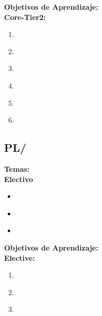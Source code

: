 \noindent \textbf{Objetivos de Aprendizaje:}\\
\noindent \textbf{Core-Tier2:}
\begin{enumerate}
	\setcounter{enumi}{0}
	\item \PLLanguageTranslationandExecutionLODistinguishA\xspace[\PLLanguageTranslationandExecutionLODistinguishALevel]\label{sec:BOK:PLLanguageTranslationandExecutionLODistinguishA}
	\item \PLLanguageTranslationandExecutionLODistinguishSyntax\xspace[\PLLanguageTranslationandExecutionLODistinguishSyntaxLevel]\label{sec:BOK:PLLanguageTranslationandExecutionLODistinguishSyntax}
	\item \PLLanguageTranslationandExecutionLOSketch\xspace[\PLLanguageTranslationandExecutionLOSketchLevel]\label{sec:BOK:PLLanguageTranslationandExecutionLOSketch}
	\item \PLLanguageTranslationandExecutionLOExplainHowImplementations\xspace[\PLLanguageTranslationandExecutionLOExplainHowImplementationsLevel]\label{sec:BOK:PLLanguageTranslationandExecutionLOExplainHowImplementations}
	\item \PLLanguageTranslationandExecutionLOIdentifyAndLeaks\xspace[\PLLanguageTranslationandExecutionLOIdentifyAndLeaksLevel]\label{sec:BOK:PLLanguageTranslationandExecutionLOIdentifyAndLeaks}
	\item \PLLanguageTranslationandExecutionLODiscussTheLimitations\xspace[\PLLanguageTranslationandExecutionLODiscussTheLimitationsLevel]\label{sec:BOK:PLLanguageTranslationandExecutionLODiscussTheLimitations}
\end{enumerate}


\subsection{PL/\PLSyntaxAnalysis}\label{sec:BOK:PLSyntaxAnalysis}
\noindent \textbf{Temas:}\\
\noindent \textbf{Electivo}
\begin{itemize}
	\item \PLSyntaxAnalysisTopicScanning\label{sec:BOK:PLSyntaxAnalysisTopicScanning}
	\item \PLSyntaxAnalysisTopicParsing\label{sec:BOK:PLSyntaxAnalysisTopicParsing}
	\item \PLSyntaxAnalysisTopicGenerating\label{sec:BOK:PLSyntaxAnalysisTopicGenerating}
\end{itemize}


\noindent \textbf{Objetivos de Aprendizaje:}\\
\noindent \textbf{Elective:}
\begin{enumerate}
	\setcounter{enumi}{0}
	\item \PLSyntaxAnalysisLOUseFormalSpecify\xspace[\PLSyntaxAnalysisLOUseFormalSpecifyLevel]\label{sec:BOK:PLSyntaxAnalysisLOUseFormalSpecify}
	\item \PLSyntaxAnalysisLOUseDeclarative\xspace[\PLSyntaxAnalysisLOUseDeclarativeLevel]\label{sec:BOK:PLSyntaxAnalysisLOUseDeclarative}
	\item \PLSyntaxAnalysisLOIdentifyKey\xspace[\PLSyntaxAnalysisLOIdentifyKeyLevel]\label{sec:BOK:PLSyntaxAnalysisLOIdentifyKey}
\end{enumerate}


